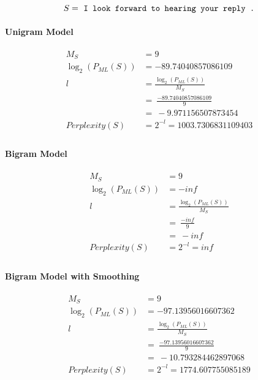 \documentclass{article}
\begin{document}
\begin{equation}
    S = \ \texttt{I look forward to hearing your reply .} \\
\end{equation}

\paragraph{Unigram Model}
\begin{equation}
\begin{split}
M_{S} &= 9 \\
\log_{2} (P_{ML}(S)) &= -89.74040857086109 \\
l &= \frac{\log_{2} (P_{ML}(S))}{M_{S}} \\ &=\ \frac{-89.74040857086109}9 \\ &=\ -9.971156507873454 \\
Perplexity(S) &= 2^{-l} = 1003.7306831109403\\
\end{split}
\end{equation}
\paragraph{Bigram Model}
\begin{equation}
\begin{split}
M_{S} &= 9 \\
\log_{2} (P_{ML}(S)) &= -inf \\
l &= \frac{\log_{2} (P_{ML}(S))}{M_{S}} \\ &=\ \frac{-inf}9 \\ &=\ -inf \\
Perplexity(S) &= 2^{-l} = inf\\
\end{split}
\end{equation}
\paragraph{Bigram Model with Smoothing}
\begin{equation}
\begin{split}
M_{S} &= 9 \\
\log_{2} (P_{ML}(S)) &= -97.13956016607362 \\
l &= \frac{\log_{2} (P_{ML}(S))}{M_{S}} \\ &=\ \frac{-97.13956016607362}9 \\ &=\ -10.793284462897068 \\
Perplexity(S) &= 2^{-l} = 1774.607755085189\\
\end{split}
\end{equation}
\end{document}

